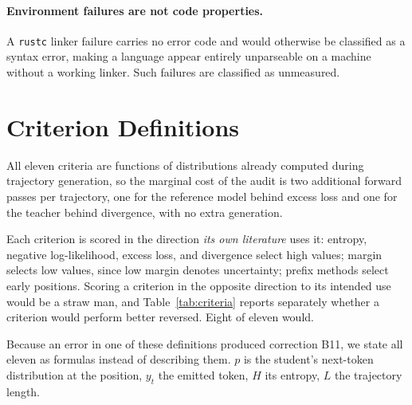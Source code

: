 \paragraph{Environment failures are not code properties.} A \texttt{rustc} linker failure carries no
error code and would otherwise be classified as a syntax error, making a language appear entirely
unparseable on a machine without a working linker. Such failures are classified as unmeasured.

\section{Criterion Definitions}
\label{app:criteria}

All eleven criteria are functions of distributions already computed during trajectory generation,
so the marginal cost of the audit is two additional forward passes per trajectory, one for the
reference model behind excess loss and one for the teacher behind divergence, with no extra
generation.

Each criterion is scored in the direction \emph{its own literature} uses it: entropy, negative
log-likelihood, excess loss, and divergence select high values; margin selects low values, since low
margin denotes uncertainty; prefix methods select early positions. Scoring a criterion in the
opposite direction to its intended use would be a straw man, and Table~\ref{tab:criteria} reports
separately whether a criterion would perform better reversed. Eight of eleven would.

Because an error in one of these definitions produced correction B11, we state all eleven as
formulas instead of describing them. $p$ is the student's next-token distribution at the position,
$y_t$ the emitted token, $H$ its entropy, $L$ the trajectory length.

